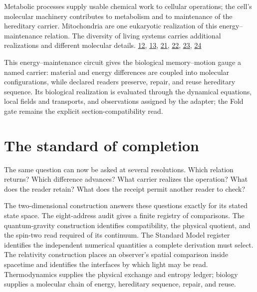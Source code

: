 Metabolic processes supply usable chemical work to cellular operations; the cell's molecular machinery contributes to metabolism and to maintenance of the hereditary carrier. Mitochondria are one eukaryotic realization of this energy--maintenance relation. The diversity of living systems carries additional realizations and different molecular details. \href{https://github.com/Coppalini-Architecture/coppalini-architecture/blob/9b7122ca5c3712c2c294e2bc5097276d0ba9817b/papers/13\%20MEMBRANE_MITOCHONDRIA_CHEMIOSMOSIS_ATP_METABOLIC_CONTROL_v0_1.md}{12}, \href{https://github.com/Coppalini-Architecture/coppalini-architecture/blob/9b7122ca5c3712c2c294e2bc5097276d0ba9817b/papers/14\%20DNA_REPLICATION_REPAIR_EXPRESSION_HEREDITARY_MEMORY_v0_1.md}{13}, \href{https://doi.org/10.1038/191144a0}{21}, \href{https://doi.org/10.1073/pnas.1816556116}{22}, \href{https://doi.org/10.1073/pnas.44.7.671}{23}, \href{https://doi.org/10.1126/science.2665076}{24}

This energy--maintenance circuit gives the biological memory--motion gauge a named carrier: material and energy differences are coupled into molecular configurations, while declared readers preserve, repair, and reuse hereditary sequence. Its biological realization is evaluated through the dynamical equations, local fields and transports, and observations assigned by the adapter; the Fold gate remains the explicit section-compatibility read.

\hypertarget{the-standard-of-completion}{%
\section{The standard of completion}\label{the-standard-of-completion}}

The same question can now be asked at several resolutions. Which relation returns? Which difference advances? What carrier realizes the operation? What does the reader retain? What does the receipt permit another reader to check?

The two-dimensional construction answers these questions exactly for its stated state space. The eight-address audit gives a finite registry of comparisons. The quantum-gravity construction identifies compatibility, the physical quotient, and the spin-two read required of its continuum. The Standard Model register identifies the independent numerical quantities a complete derivation must select. The relativity construction places an observer's spatial comparison inside spacetime and identifies the interfaces by which light may be read. Thermodynamics supplies the physical exchange and entropy ledger; biology supplies a molecular chain of energy, hereditary sequence, repair, and reuse.

